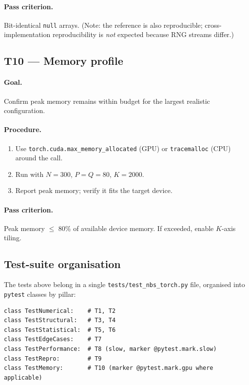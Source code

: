 \documentclass[11pt]{article}
\begin{document}
\paragraph{Pass criterion.} Bit-identical \texttt{null} arrays. (Note: the reference is also reproducible; cross-implementation reproducibility is \emph{not} expected because RNG streams differ.)

\subsection{T10 --- Memory profile}

\paragraph{Goal.} Confirm peak memory remains within budget for the largest realistic configuration.

\paragraph{Procedure.}
\begin{enumerate}[leftmargin=2.0em]
\item Use \texttt{torch.cuda.max\_memory\_allocated} (GPU) or \texttt{tracemalloc} (CPU) around the call.
\item Run with $N=300$, $P=Q=80$, $K=2000$.
\item Report peak memory; verify it fits the target device.
\end{enumerate}

\paragraph{Pass criterion.} Peak memory $\le$ 80\% of available device memory. If exceeded, enable $K$-axis tiling.

\subsection{Test-suite organisation}

The tests above belong in a single \texttt{tests/test\_nbs\_torch.py} file, organised into \texttt{pytest} classes by pillar:

\begin{lstlisting}
class TestNumerical:    # T1, T2
class TestStructural:   # T3, T4
class TestStatistical:  # T5, T6
class TestEdgeCases:    # T7
class TestPerformance:  # T8 (slow, marker @pytest.mark.slow)
class TestRepro:        # T9
class TestMemory:       # T10 (marker @pytest.mark.gpu where applicable)
\end{lstlisting}
\end{document}

